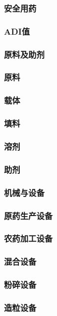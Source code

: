 \documentclass[UTF8]{../../ApplicationUniverse}
\begin{document}
            \subsubsection{安全用药}
            \subsubsection{ADI值}
    \subsubsection{原料及助剂}
        \subsubsection{原料}
        \subsubsection{载体}
        \subsubsection{填料}
        \subsubsection{溶剂}
        \subsubsection{助剂}
    \subsubsection{机械与设备}
        \subsubsection{原药生产设备}
        \subsubsection{农药加工设备}
            \subsubsection{混合设备}
            \subsubsection{粉碎设备}
            \subsubsection{造粒设备}
\end{document}
